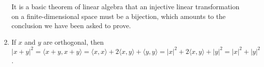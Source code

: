 \documentclass{article}
\begin{document}
\begin{enumerate}[label=\textbf{1-\arabic*.}]
It is a basic theorem of linear algebra that an injective linear transformation on a finite-dimensional space must be a bijection, which amounts to the conclusion we have been asked to prove.
\item If $x$ and $y$ are orthogonal, then $|x+y|^2 = \langle x+y,x+y\rangle = \langle x,x\rangle + 2\langle x,y\rangle + \langle y,y\rangle = |x|^2 + 2\langle x,y\rangle + |y|^2 = |x|^2 + |y|^2$.
\end{enumerate}
\end{document}
